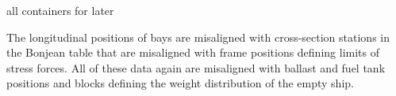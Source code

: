 \documentclass[runningheads]{llncs}
\begin{document}
all containers for later         



The longitudinal positions of bays are misaligned with cross-section stations in the Bonjean table that are misaligned with frame positions defining limits of stress forces. All of these data again are misaligned with ballast and fuel tank positions and blocks defining the weight distribution of the empty ship.





\end{document}

